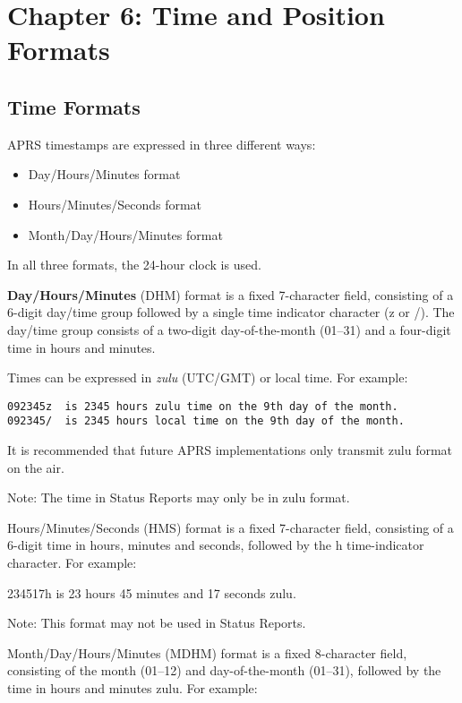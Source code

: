 \chapter{Chapter 6: Time and Position Formats}


\section{Time Formats}

APRS timestamps are expressed in three different ways:

\begin{itemize}
\item Day/Hours/Minutes format
\item Hours/Minutes/Seconds format
\item Month/Day/Hours/Minutes format
\end{itemize}

In all three formats, the 24-hour clock is used.

{\bf Day/Hours/Minutes} (DHM) format is a fixed 7-character field,
consisting of a 6-digit day/time group followed by a single time
indicator character (z or /). The day/time group consists of a
two-digit day-of-the-month (01–31) and a four-digit time in hours and
minutes.

Times can be expressed in {\it zulu} (UTC/GMT) or local time. For example:

\begin{verbatim}
092345z  is 2345 hours zulu time on the 9th day of the month. 
092345/  is 2345 hours local time on the 9th day of the month. 
\end{verbatim}
 
It is recommended that future APRS implementations only transmit zulu
format on the air.

Note: The time in Status Reports may only be in zulu format.

Hours/Minutes/Seconds (HMS) format is a fixed 7-character field,
consisting of a 6-digit time in hours, minutes and seconds, followed by the h
time-indicator character. For example:

234517h is 23 hours 45 minutes and 17 seconds zulu.

Note: This format may not be used in Status Reports.

Month/Day/Hours/Minutes (MDHM) format is a fixed 8-character field,
consisting of the month (01–12) and day-of-the-month (01–31), followed by
the time in hours and minutes zulu. For example:

